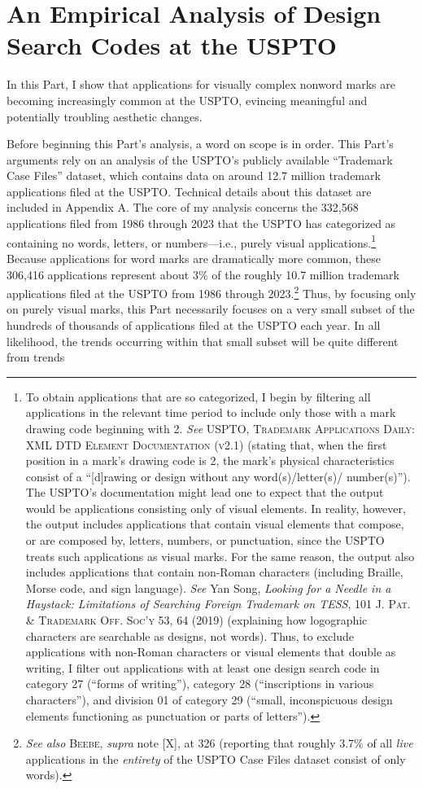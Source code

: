 \documentclass[letterpaper, 11pt, oneside]{article}
\begin{document}
\section{An Empirical Analysis of Design Search Codes at the USPTO}\label{sec:2}

In this Part, I show that applications for visually complex nonword marks are becoming increasingly common at the USPTO, evincing meaningful and potentially troubling aesthetic changes.

Before beginning this Part's analysis, a word on scope is in order. This Part's arguments rely on an analysis of the USPTO's publicly available ``Trademark Case Files'' dataset, which contains data on around 12.7 million trademark applications filed at the USPTO. Technical details about this dataset are included in Appendix A. The core of my analysis concerns the 332,568 applications filed from 1986 through 2023 that the USPTO has categorized as containing no words, letters, or numbers—i.e., purely visual applications.\footnote{To obtain applications that are so categorized, I begin by filtering all applications in the relevant time period to include only those with a mark drawing code beginning with 2. \textit{See} USPTO, \textsc{Trademark Applications Daily: XML DTD Element Documentation (v2.1)} (stating that, when the first position in a mark's drawing code is 2, the mark's physical characteristics consist of a ``[d]rawing or design without any word(s)/letter(s)/ number(s)''). The USPTO's documentation might lead one to expect that the output would be applications consisting only of visual elements. In reality, however, the output includes applications that contain visual elements that compose, or are composed by, letters, numbers, or punctuation, since the USPTO treats such applications as visual marks. For the same reason, the output also includes applications that contain non-Roman characters (including Braille, Morse code, and sign language). \textit{See} Yan Song, \textit{Looking for a Needle in a Haystack: Limitations of Searching Foreign Trademark on TESS}, 101 \textsc{J. Pat. \& Trademark Off. Soc'y} 53, 64 (2019) (explaining how logographic characters are searchable as designs, not words). Thus, to exclude applications with non-Roman characters or visual elements that double as writing, I filter out applications with at least one design search code in category 27 (``forms of writing''), category 28 (``inscriptions in various characters''), and division 01 of category 29 (``small, inconspicuous design elements functioning as punctuation or parts of letters'').} Because applications for word marks are dramatically more common, these 306,416 applications represent about 3\% of the roughly 10.7 million trademark applications filed at the USPTO from 1986 through 2023.\footnote{\textit{See also} \textsc{Beebe}, \textit{supra} note [X], at 326 (reporting that roughly 3.7\% of all \textit{live} applications in the \textit{entirety} of the USPTO Case Files dataset consist of only words).} Thus, by focusing only on purely visual marks, this Part necessarily focuses on a very small subset of the hundreds of thousands of applications filed at the USPTO each year. In all likelihood, the trends occurring within that small subset will be quite different from trends 
\end{document}
